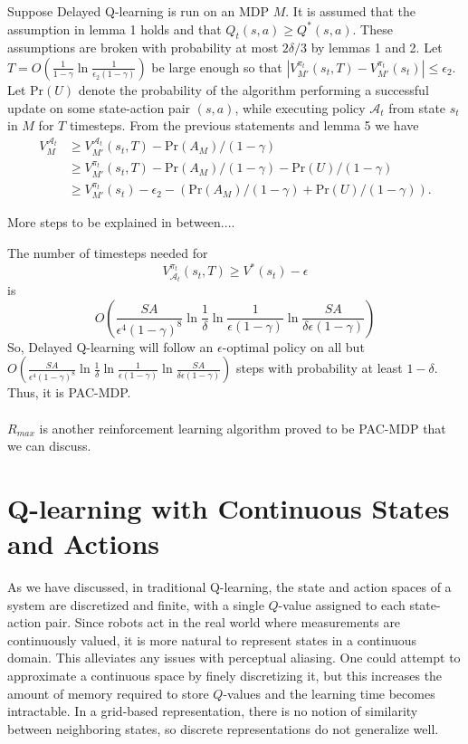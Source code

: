 \documentclass{article} %
\begin{document}
Suppose Delayed Q-learning is run on an MDP $M$. It is assumed that the assumption in lemma 1 holds and that $Q_t(s,a) \geq Q^*(s,a)$.  These assumptions are broken with probability at most $2\delta/3$ by lemmas 1 and 2.  
Let $T=O\left(\frac{1}{1-\gamma}\ln{\frac{1}{\epsilon_2(1-\gamma)}}\right)$ be large enough so that $|V_{M'}^{\pi_t}(s_t,T) - V_{M'}^{\pi_t}(s_t)| \leq \epsilon_2$.   Let $\text{Pr}(U)$ denote the probability of
the algorithm performing a successful update on some
state-action pair $(s, a)$, while executing policy
$\mathcal{A}_t$ from state $s_t$ in $M$ for $T$ timesteps. From the previous statements and lemma 5 we have 
\begin{align*}
V_M^{\mathcal{A}_t} & \geq V_{M'}^{\mathcal{A}_t}(s_t,T)-\text{Pr}(A_M)/(1-\gamma) \\
 & \geq V_{M'}^{\pi_t}(s_t,T)-\text{Pr}(A_M)/(1-\gamma) -\text{Pr}(U)/(1-\gamma) \\
 & \geq V_{M'}^{\pi_t}(s_t)-\epsilon_2-(\text{Pr}(A_M)/(1-\gamma) +\text{Pr}(U)/(1-\gamma)). 
\end{align*}



More steps to be explained in between....

The number of timesteps needed for 
$$V_{\mathcal{A}_t}^{\pi_t}(s_t,T) \geq V^*(s_t)-\epsilon$$
is 
$$O\left(\frac{SA}{\epsilon^4(1-\gamma)^8}\ln{\frac{1}{\delta}}\ln{\frac{1}{\epsilon(1-\gamma)}}\ln{\frac{SA}{\delta\epsilon(1-\gamma)}}\right)$$
So, Delayed Q-learning will follow an $\epsilon$-optimal policy on all but $O\left(\frac{SA}{\epsilon^4(1-\gamma)^8}\ln{\frac{1}{\delta}}\ln{\frac{1}{\epsilon(1-\gamma)}}\ln{\frac{SA}{\delta\epsilon(1-\gamma)}}\right)$ steps with probability at least $1-\delta$.  Thus, it is PAC-MDP.
\\ 
\\
$R_{max}$ is another reinforcement learning algorithm proved to be PAC-MDP that we can discuss.
\section{Q-learning with Continuous States and Actions}
As we have discussed, in traditional Q-learning, the state and action spaces of a system are discretized and finite, with a single $Q$-value assigned to each state-action pair.  Since robots act in the real world where measurements are continuously valued, it is more natural to represent states in a continuous domain.  This alleviates any issues with perceptual aliasing.  One could attempt to approximate a continuous space by finely discretizing it, but this increases the amount of memory required to store $Q$-values and the learning time becomes intractable.  In a grid-based representation, there is no notion of similarity between neighboring states, so discrete representations do not generalize well.  
\end{document}
